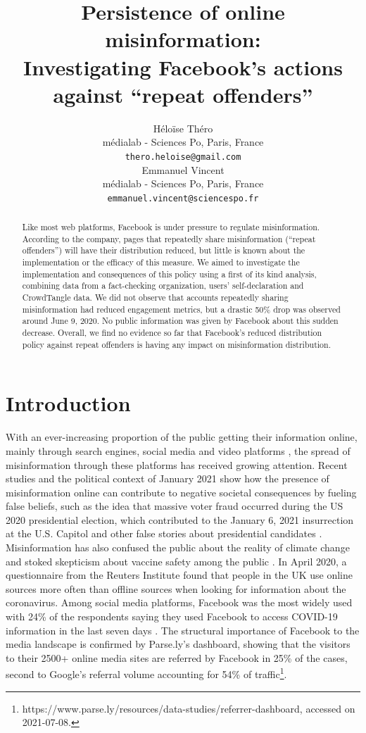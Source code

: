 \documentclass[11pt,a4paper]{article}
\title{Persistence of online misinformation: \\ Investigating Facebook's actions against ``repeat offenders''}
\author{Héloïse Théro \\
  médialab - Sciences Po, Paris, France \\
  \texttt{thero.heloise@gmail.com} \\\And
  Emmanuel Vincent \\
  médialab - Sciences Po, Paris, France \\
  \texttt{emmanuel.vincent@sciencespo.fr} \\}
\date{}
\begin{document}
\maketitle

\begin{abstract}
{\color{red}
Like most web platforms, Facebook is under pressure to regulate misinformation. 
According to the company, pages that repeatedly share misinformation (“repeat offenders”) will have their distribution reduced, but little is known about the implementation or the efficacy of this measure. 
We aimed to investigate the implementation and consequences of this policy using a first of its kind analysis, combining data from a fact-checking organization, users’ self-declaration and CrowdTangle data. 
We did not observe that accounts repeatedly sharing misinformation had reduced engagement metrics, but a drastic 50\% drop was observed around June 9, 2020. 
No public information was given by Facebook about this sudden decrease. 
Overall, we find no evidence so far that Facebook’s reduced distribution policy against repeat offenders is having any impact on misinformation distribution.
}
\end{abstract}

\section{Introduction}

With an ever-increasing proportion of the public getting their information online, mainly through search engines, social media and video platforms \citep{mitchell2016modern}, the spread of misinformation through these platforms has received growing attention. 
Recent studies and the political context of January 2021 show how the presence of misinformation online can contribute to negative societal consequences by fueling false beliefs, such as the idea that massive voter fraud occurred during the US 2020 presidential election, which contributed to the January 6, 2021 insurrection at the U.S. Capitol \citep{benkler2020mail} and other false stories about presidential candidates \citep{allcott2017social}. 
Misinformation has also confused the public about the reality of climate change \citep{brulle30years, porter2019can} and stoked skepticism about vaccine safety among the public \citep{featherstone2020feeling, lahouati2020spread}. 
In April 2020, a questionnaire from the Reuters Institute found that people in the UK use online sources more often than offline sources when looking for information about the coronavirus. 
Among social media platforms, Facebook was the most widely used with 24\% of the respondents saying they used Facebook to access COVID-19 information in the last seven days \citep{fletcher2020information}. 
The structural importance of Facebook to the media landscape is confirmed by Parse.ly’s dashboard, showing that the visitors to their 2500+ online media sites are referred by Facebook in 25\% of the cases, second to Google’s referral volume accounting for 54\% of traffic\footnote{https://www.parse.ly/resources/data-studies/referrer-dashboard, accessed on 2021-07-08.}.
\end{document}
